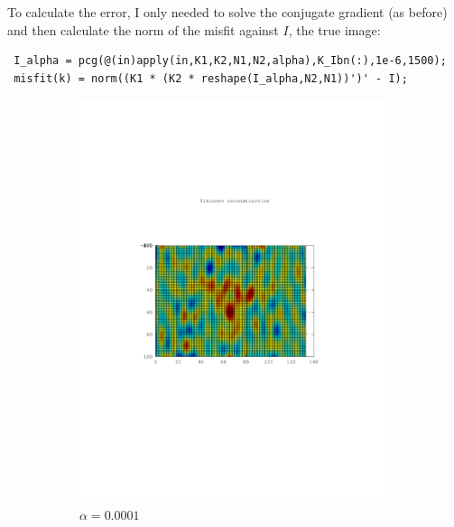 \documentclass{article}
\begin{document}
To calculate the error, I only needed to solve the conjugate gradient
(as before) and then calculate the norm of the misfit against $I$, the
true image:
\begin{lstlisting}
 I_alpha = pcg(@(in)apply(in,K1,K2,N1,N2,alpha),K_Ibn(:),1e-6,1500);
 misfit(k) = norm((K1 * (K2 * reshape(I_alpha,N2,N1))')' - I);        
\end{lstlisting}
\begin{figure}[!htb]
        \centering
        \begin{subfigure}[bh]{0.65\textwidth}
                \includegraphics[width=\textwidth]{plots/tikrecon0001.pdf}
                \caption{$\alpha=0.0001$}
        \end{subfigure}%
        \begin{subfigure}[bh]{0.65\textwidth}

\end{subfigure}
\end{figure}
\end{document}

